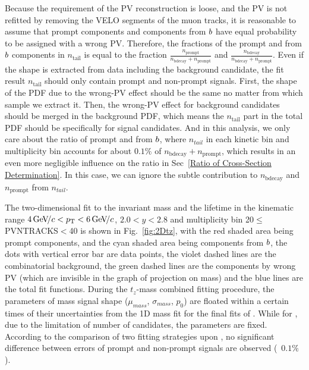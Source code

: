 Because the requirement of the PV reconstruction is loose, and the PV is not refitted by removing the VELO segments of the muon tracks, it is reasonable to assume that prompt components and components from ${b}$ have equal probability to be assigned with a wrong PV.
Therefore, the fractions of the prompt and from ${b}$ components in $n_{\mathrm{tail}}$ is equal to the fraction $\frac{n_{\mathrm{prompt}}}{n_{\mathrm{bdecay}}+n_{\mathrm{prompt}}}$ and $\frac{n_{\mathrm{bdecay}}}{n_{\mathrm{bdecay}}+n_{\mathrm{prompt}}}$. 
Even if the shape is extracted from data including the background candidate, the fit result $n_{\mathrm{tail}}$ should only contain prompt and non-prompt signals. First, the shape of the PDF due to the wrong-PV effect should be the same no matter from which sample we extract it. Then, 
the wrong-PV effect for background candidates should be merged in the background PDF, which means the $n_{\mathrm{tail}}$ part in the total PDF should be specifically for signal candidates.
And in this analysis, we only care about the ratio of prompt and from ${b}$, where $n_{tail}$ in each kinetic bin and multiplicity bin accounts for about $0.1\%$ of $n_{\mathrm{bdecay}}+n_{\mathrm{prompt}}$, which results in an even more negligible influence on the ratio in Sec~\ref{Ratio of Cross-Section Determination}. 
In this case, we can ignore the subtle contribution to $n_{\mathrm{bdecay}}$ and $n_{\mathrm{prompt}}$ from $n_{tail}$. 

The two-dimensional fit to the invariant mass and the lifetime in the kinematic range $4\text{\,Ge\kern -0.1em V\!/}c<p_{\mathrm{T}}<6\text{\,Ge\kern -0.1em V\!/}c$, $2.0<y<2.8$ 
and multiplicity bin 20$\leq$PVNTRACKS$<$40 is shown in Fig.~\ref{fig:2Dtz}, with the red shaded area being prompt components, and the cyan shaded area being components from ${b}$, 
the dots with vertical error bar are data points, the violet dashed lines are the combinatorial background, the green dashed lines are the components by wrong PV (which are invisible in the graph of projection on mass) and 
the blue lines are the total fit functions.
During the $t_z$-mass combined fitting procedure, the parameters of mass signal shape ($\mu_{mass}$, $\sigma_{mass}$, $p_{0}$) are floated within a certain times of their uncertainties from the 1D mass fit for the final fits of \jpsi. While for \psitwos, due to the limitation of number of candidates, the parameters are fixed. According to the comparison of two fitting strategies upon \jpsi, no significant difference between errors of prompt and non-prompt signals are observed (~$0.1\%$).

